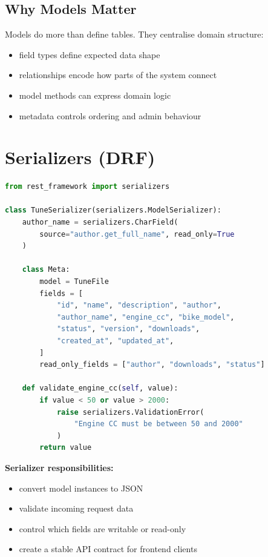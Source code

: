 \documentclass[12pt, a4paper, oneside]{book}
\begin{document}
\subsection{Why Models Matter}
Models do more than define tables. They centralise domain structure:
\begin{itemize}[leftmargin=2em]
    \item field types define expected data shape
    \item relationships encode how parts of the system connect
    \item model methods can express domain logic
    \item metadata controls ordering and admin behaviour
\end{itemize}

\section{Serializers (DRF)}

\begin{lstlisting}[language=Python, caption={DRF serializers}]
from rest_framework import serializers

class TuneSerializer(serializers.ModelSerializer):
    author_name = serializers.CharField(
        source="author.get_full_name", read_only=True
    )

    class Meta:
        model = TuneFile
        fields = [
            "id", "name", "description", "author",
            "author_name", "engine_cc", "bike_model",
            "status", "version", "downloads",
            "created_at", "updated_at",
        ]
        read_only_fields = ["author", "downloads", "status"]

    def validate_engine_cc(self, value):
        if value < 50 or value > 2000:
            raise serializers.ValidationError(
                "Engine CC must be between 50 and 2000"
            )
        return value
\end{lstlisting}

\textbf{Serializer responsibilities:}
\begin{itemize}[leftmargin=2em]
    \item convert model instances to JSON
    \item validate incoming request data
    \item control which fields are writable or read-only
    \item create a stable API contract for frontend clients
\end{itemize}
\end{document}
